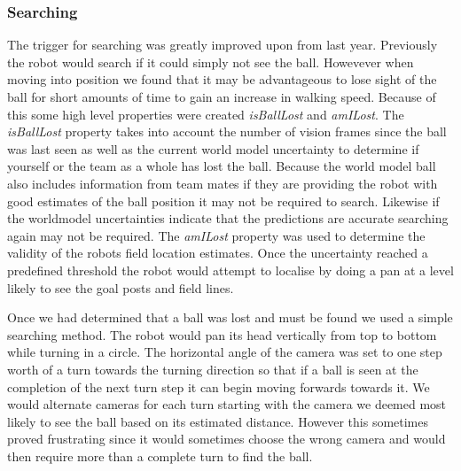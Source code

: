 \subsubsection{Searching}
The trigger for searching was greatly improved upon from last year. Previously the robot would search if it could simply not see the ball. Howevever when moving into position we found that it may be advantageous to lose sight of the ball for short amounts of time to gain an increase in walking speed. Because of this some high level properties were created \emph{isBallLost} and \emph{amILost}. The \emph{isBallLost} property takes into account the number of vision frames since the ball was last seen as well as the current world model uncertainty to determine if yourself or the team as a whole has lost the ball. Because the world model ball also includes information from team mates if they are providing the robot with good estimates of the ball position it may not be required to search. Likewise if the worldmodel uncertainties indicate that the predictions are accurate searching again may not be required. The \emph{amILost} property was used to determine the validity of the robots field location estimates. Once the uncertainty reached a predefined threshold the robot would attempt to localise by doing a pan at a level likely to see the goal posts and field lines.

Once we had determined that a ball was lost and must be found we used a simple searching method. The robot would pan its head vertically from top to bottom while turning in a circle. The horizontal angle of the camera was set to one step worth of a turn towards the turning direction so that if a ball is seen at the completion of the next turn step it can begin moving forwards towards it. We would alternate cameras for each turn starting with the camera we deemed most likely to see the ball based on its estimated distance. However this sometimes proved frustrating since it would sometimes choose the wrong camera and would then require more than a complete turn to find the ball.


